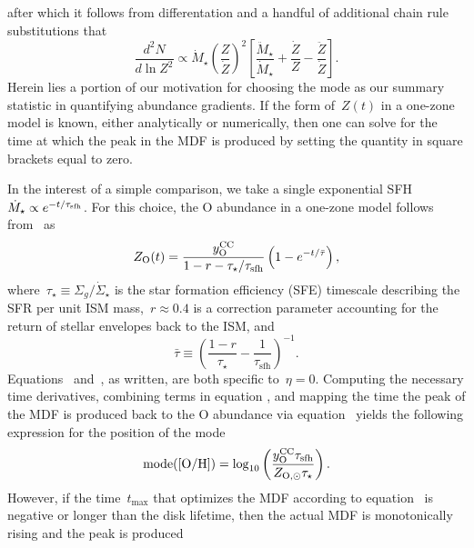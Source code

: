 after which it follows from differentation and a handful of additional chain
rule substitutions that
\begin{equation}
\frac{d^2N}{d \ln Z^2} \propto \dot{M}_\star
\left(\frac{Z}{\dot{Z}}\right)^2
\left[
\frac{\ddot{M}_\star}{\dot{M}_\star} + \frac{\dot{Z}}{Z} -
\frac{\ddot{Z}}{\dot{Z}}
\right].
\label{outflows:eq:mdf-derivative}
\end{equation}
Herein lies a portion of our motivation for choosing the mode as our summary
statistic in quantifying abundance gradients.
If the form of~$Z(t)$ in a one-zone model is known, either analytically or
numerically, then one can solve for the time at which the peak in the MDF is
produced by setting the quantity in square brackets equal to zero.
\par
In the interest of a simple comparison, we take a single exponential SFH
$\dot{M}_\star \propto e^{-t / \tau_\text{sfh}}$.
For this choice, the O abundance in a one-zone model follows
from~\citet{Weinberg2017b} as 
\begin{equation}
Z_\text{O}(t) = \frac{y_\text{O}^\text{CC}}{1 - r - \tau_\star / \tau_\text{sfh}}
\left(1 - e^{-t / \bar{\tau}}\right),
\label{outflows:eq:zo-waf17}
\end{equation}
where~$\tau_\star \equiv \Sigma_g / \dot{\Sigma}_\star$ is the star formation
efficiency (SFE) timescale describing the SFR per unit ISM mass,~$r \approx 0.4$
is a correction parameter accounting for the return of stellar envelopes back
to the ISM, and
\begin{equation}
\bar{\tau} \equiv \left(
\frac{1 - r}{\tau_\star} - \frac{1}{\tau_\text{sfh}}
\right)^{-1}.
\label{outflows:eq:taubar-def}
\end{equation}
Equations~ and~, as
written, are both specific to~$\eta = 0$.
Computing the necessary time derivatives, combining terms in equation
, and mapping the time the peak of the MDF is
produced back to the O abundance via equation~
yields the following expression for the position of the mode
\begin{equation}
\text{mode([O/H])} = \log_{10} \left(
\frac{y_\text{O}^\text{CC} \tau_\text{sfh}}{Z_{\text{O},\odot} \tau_\star}
\right).
\end{equation}
However, if the time~$t_\text{max}$ that optimizes the MDF according to
equation~ is negative or longer than the disk
lifetime, then the actual MDF is monotonically rising and the peak is produced
